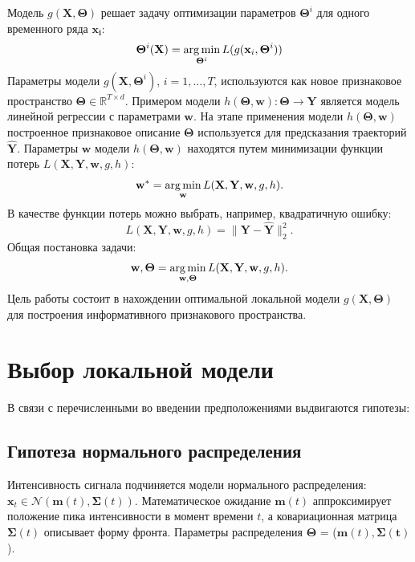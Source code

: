 \documentclass[12pt,twoside]{article}
\begin{document}
Модель $g(\mathbf{X}, \mathbf{\Theta})$ решает задачу оптимизации параметров $\mathbf{\Theta}^{i}$ для одного временного ряда $\mathbf{x_{i}}$:
\begin{equation}
\mathbf{\Theta}^i(\mathbf{X}) = \argmin_{\mathbf{\Theta}^i} L(g(\mathbf{x}_i, \mathbf{\Theta}^i))
\end{equation}
Параметры модели $g(\mathbf{X}, \mathbf{\Theta}^i)$, $i = 1,\dots,T$, используются как новое признаковое пространство $\mathbf{\Theta}\in\mathbb{R}^{T\times d}$.
Примером модели $h(\mathbf{\Theta}, \mathbf{w}): \mathbf{\Theta}\to\mathbf{Y}$ является модель линейной регрессии с параметрами $\mathbf{w}$. На этапе применения модели $h(\mathbf{\Theta}, \mathbf{w})$ построенное признаковое описание $\mathbf{\Theta}$ используется для предсказания траекторий $\mathbf{\hat{Y}}$.
Параметры $\mathbf{w}$ модели $h(\mathbf{\Theta}, \mathbf{w})$ находятся путем минимизации функции потерь $L(\mathbf{X}, \mathbf{Y}, \mathbf{w}, g, h)$:
\begin{equation}
\mathbf{w^*} = \argmin_{\mathbf{w}} L(\mathbf{X}, \mathbf{Y}, \mathbf{w}, g, h).
\end{equation}
В качестве функции потерь можно выбрать, например, квадратичную ошибку:
\begin{equation}
L(\mathbf{X}, \mathbf{Y}, \mathbf{w}, g, h) = \|\mathbf{Y}-\mathbf{\hat{Y}}\|^2_2.
\end{equation}
Общая постановка задачи:
\begin{equation}
\mathbf{w}, \mathbf{\Theta} = \argmin_{\mathbf{w}, \mathbf{\Theta}} L(\mathbf{X}, \mathbf{Y}, \mathbf{w}, g, h).
\end{equation}
Цель работы состоит в нахождении оптимальной локальной модели $g(\mathbf{X}, \mathbf{\Theta})$ для построения информативного признакового пространства.

\section{Выбор локальной модели}
В связи с перечисленными во введении предположениями выдвигаются гипотезы: 

\subsection{Гипотеза нормального распределения}
Интенсивность сигнала подчиняется модели нормального распределения: $\mathbf{x}_t \in \mathcal{N}(\mathbf{m}(t),\mathbf{\Sigma}(t))$. Математическое ожидание $\mathbf{m}(t)$ аппроксимирует положение пика интенсивности в момент времени $t$, а ковариационная матрица $\mathbf{\Sigma}(t)$ описывает форму фронта. Параметры распределения $\mathbf{\Theta}$ = ($\mathbf{m}(t), \mathbf{\Sigma(t)}$).
\end{document}
